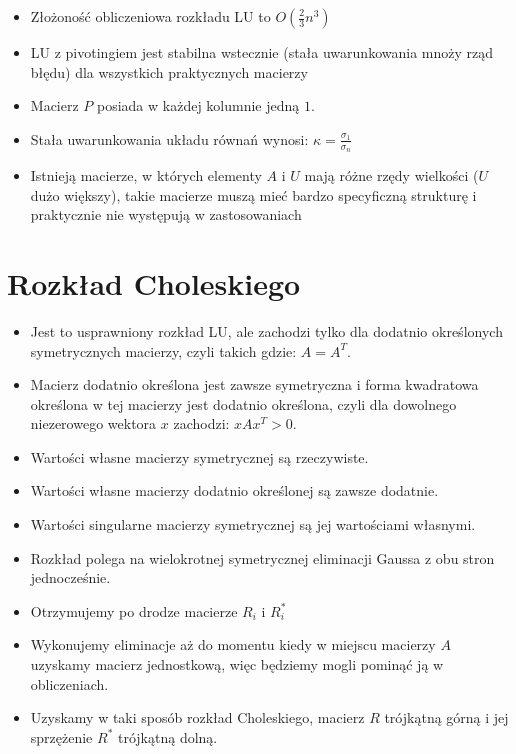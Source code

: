\documentclass[a4paper]{article}
\begin{document}
\begin{itemize}
    \item Złożoność obliczeniowa rozkładu LU to $O(\frac{2}{3} n^3)$
    \item LU z pivotingiem jest stabilna wstecznie (stała uwarunkowania mnoży rząd błędu) dla wszystkich praktycznych macierzy
    \item Macierz $P$ posiada w każdej kolumnie jedną $1$.
    \item Stała uwarunkowania układu równań wynosi: $\kappa=\frac{\sigma_1}{\sigma_n}$ 
    \item Istnieją macierze, w których elementy $A$ i $U$ mają różne rzędy wielkości ($U$ dużo większy), takie macierze muszą mieć bardzo specyficzną strukturę i praktycznie nie występują w zastosowaniach
\end{itemize}

\section{Rozkład Choleskiego}

\begin{itemize}
    \item Jest to usprawniony rozkład LU, ale zachodzi tylko dla dodatnio określonych symetrycznych macierzy, czyli takich gdzie: $A = A^T$.
    \item Macierz dodatnio określona jest zawsze symetryczna i forma kwadratowa określona w tej macierzy jest dodatnio określona, czyli dla dowolnego niezerowego wektora $x$ zachodzi: $xAx^T>0$.
    \item Wartości własne macierzy symetrycznej są rzeczywiste.
    \item Wartości własne macierzy dodatnio określonej są zawsze dodatnie.
    \item Wartości singularne macierzy symetrycznej są jej wartościami własnymi.
    \item Rozkład polega na wielokrotnej symetrycznej eliminacji Gaussa z obu stron jednocześnie.
    \item Otrzymujemy po drodze macierze $R_i$ i $R_i^*$
    \item Wykonujemy eliminacje aż do momentu kiedy w miejscu macierzy $A$ uzyskamy macierz jednostkową, więc będziemy mogli pominąć ją w obliczeniach.
    \item Uzyskamy w taki sposób rozkład Choleskiego, macierz $R$ trójkątną górną i jej sprzężenie $R^*$ trójkątną dolną.
\end{itemize}
\end{document}
